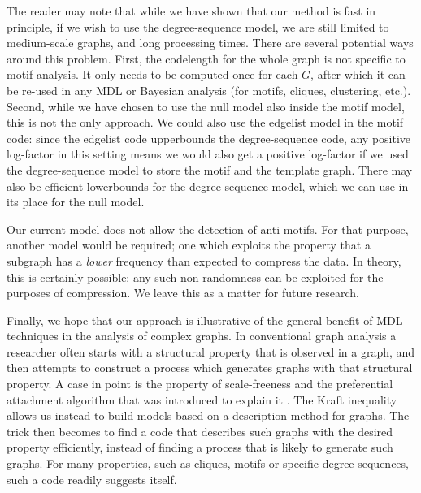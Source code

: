 The reader may note that while we have shown that our method is fast in principle, if we wish to use the degree-sequence model, we are still limited to medium-scale graphs, and long processing times. There are several potential ways around this problem. First, the codelength for the whole graph is not specific to motif analysis. It only needs to be computed once for each $G$, after which it can be re-used in any MDL or Bayesian analysis (for motifs, cliques, clustering, etc.). Second, while we have chosen to use the null model also inside the motif model, this is not the only approach. We could also use the edgelist model in the motif code: since the edgelist code upperbounds the degree-sequence code, any positive log-factor in this setting means we would also get a positive log-factor if we used the degree-sequence model to store the motif and the template graph. There may also be efficient lowerbounds for the degree-sequence model, which we can use in its place for the null model. \footnotemark


Our current model does not allow the detection of anti-motifs. For that purpose, another model would be required; one which exploits the property that a subgraph has a \emph{lower} frequency than expected to compress the data. In theory, this is certainly possible: any such non-randomness can be exploited for the purposes of compression. We leave this as a matter for future research.

Finally, we hope that our approach is illustrative of the general benefit of MDL techniques in the analysis of complex graphs. In conventional graph analysis a researcher often starts with a structural property that is observed in a graph, and then attempts to construct a process which generates graphs with that structural property. A case in point is the property of scale-freeness and the preferential attachment algorithm that was introduced to explain it \cite{albert2002statistical}. The Kraft inequality allows us instead to build models based on a description method for graphs. The trick then becomes to find a code that describes such graphs  with the desired property efficiently, instead of finding a process that is likely to generate such graphs. For many properties, such as cliques, motifs or specific degree sequences, such a code readily suggests itself. 


